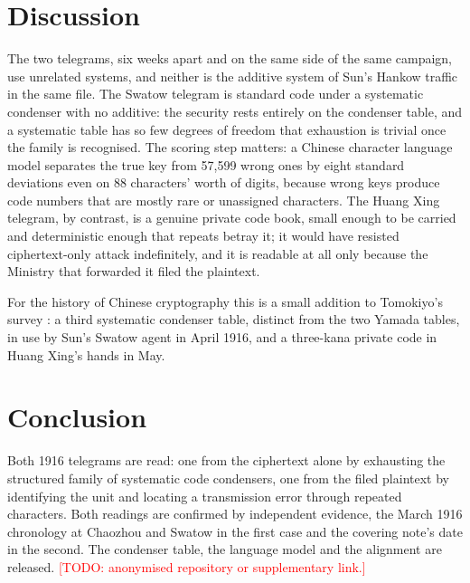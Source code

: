 \documentclass[11pt]{article}
\newcommand{\todo}[1]{\textcolor{red}{[TODO: #1]}}
\begin{document}
\section{Discussion}\label{sec:disc}

The two telegrams, six weeks apart and on the same side of the same campaign, use unrelated systems, and neither is the additive system of Sun's Hankow traffic in the same file. The Swatow telegram is standard code under a systematic condenser with no additive: the security rests entirely on the condenser table, and a systematic table has so few degrees of freedom that exhaustion is trivial once the family is recognised. The scoring step matters: a Chinese character language model separates the true key from 57,599 wrong ones by eight standard deviations even on 88 characters' worth of digits, because wrong keys produce code numbers that are mostly rare or unassigned characters. The Huang Xing telegram, by contrast, is a genuine private code book, small enough to be carried and deterministic enough that repeats betray it; it would have resisted ciphertext-only attack indefinitely, and it is readable at all only because the Ministry that forwarded it filed the plaintext.

For the history of Chinese cryptography this is a small addition to Tomokiyo's survey : a third systematic condenser table, distinct from the two Yamada tables, in use by Sun's Swatow agent in April 1916, and a three-kana private code in Huang Xing's hands in May.

\section{Conclusion}

Both 1916 telegrams are read: one from the ciphertext alone by exhausting the structured family of systematic code condensers, one from the filed plaintext by identifying the unit and locating a transmission error through repeated characters. Both readings are confirmed by independent evidence, the March 1916 chronology at Chaozhou and Swatow in the first case and the covering note's date in the second. The condenser table, the language model and the alignment are released. \todo{anonymised repository or supplementary link.}



\end{document}
